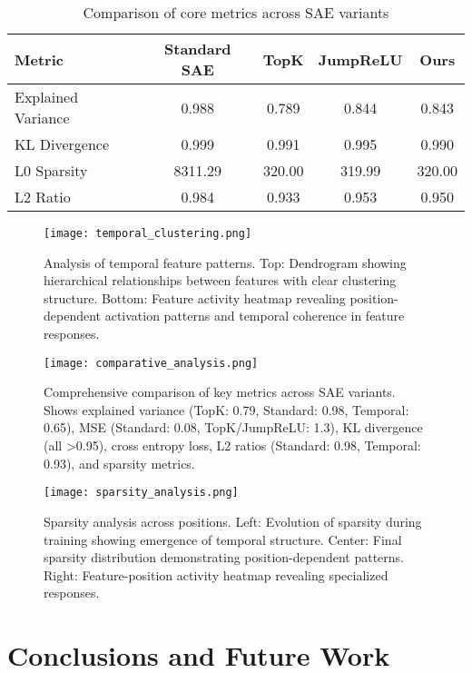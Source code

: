 \documentclass{article} %
\begin{document}
\begin{table}[h]
\centering
\caption{Comparison of core metrics across SAE variants}
\label{tab:core_metrics}
\begin{tabular}{lcccc}
\toprule
Metric & Standard SAE & TopK & JumpReLU & Ours \\
\midrule
Explained Variance & 0.988 & 0.789 & 0.844 & 0.843 \\
KL Divergence & 0.999 & 0.991 & 0.995 & 0.990 \\
L0 Sparsity & 8311.29 & 320.00 & 319.99 & 320.00 \\
L2 Ratio & 0.984 & 0.933 & 0.953 & 0.950 \\
\bottomrule
\end{tabular}
\end{table}

\begin{figure}[h]
\centering
\texttt{[image: temporal\_clustering.png]}
\caption{Analysis of temporal feature patterns. Top: Dendrogram showing hierarchical relationships between features with clear clustering structure. Bottom: Feature activity heatmap revealing position-dependent activation patterns and temporal coherence in feature responses.}
\label{fig:temporal_clustering}
\end{figure}

\begin{figure}[h]
\centering
\texttt{[image: comparative\_analysis.png]}
\caption{Comprehensive comparison of key metrics across SAE variants. Shows explained variance (TopK: 0.79, Standard: 0.98, Temporal: 0.65), MSE (Standard: 0.08, TopK/JumpReLU: 1.3), KL divergence (all >0.95), cross entropy loss, L2 ratios (Standard: 0.98, Temporal: 0.93), and sparsity metrics.}
\label{fig:comparative_analysis}
\end{figure}

\begin{figure}[h]
\centering
\texttt{[image: sparsity\_analysis.png]}
\caption{Sparsity analysis across positions. Left: Evolution of sparsity during training showing emergence of temporal structure. Center: Final sparsity distribution demonstrating position-dependent patterns. Right: Feature-position activity heatmap revealing specialized responses.}
\label{fig:position_analysis}
\end{figure}

\section{Conclusions and Future Work}
\label{sec:conclusion}
\end{document}

